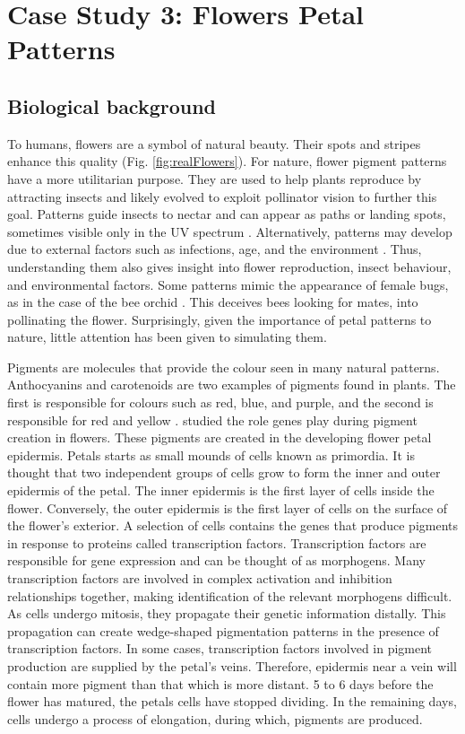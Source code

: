 \chapter{Case Study 3: Flowers Petal Patterns}

\section{Biological background}
To humans, flowers are a symbol of natural beauty. Their spots and stripes enhance this quality (Fig. \ref{fig:realFlowers}). For nature, flower pigment patterns have a more utilitarian purpose. They are used to help plants reproduce by attracting insects and likely evolved to exploit pollinator vision to further this goal. Patterns guide insects to nectar and can appear as paths or landing spots, sometimes visible only in the UV spectrum \citep{davies2012}. Alternatively, patterns may develop due to external factors such as infections, age, and the environment \citep{davies2012, robinson2015}. Thus, understanding them also gives insight into flower reproduction, insect behaviour, and environmental factors. Some patterns mimic the appearance of female bugs, as in the case of the bee orchid \citep{vereecken7484}. This deceives bees looking for mates, into pollinating the flower. Surprisingly, given the importance of petal patterns to nature, little attention has been given to simulating them.

Pigments are molecules that provide the colour seen in many natural patterns. Anthocyanins and carotenoids are two examples of pigments found in plants. The first is responsible for colours such as red, blue, and purple, and the second is responsible for red and yellow \citep{bayer1966}. \citet{martin1993} studied the role genes play during pigment creation in flowers. These pigments are created in the developing flower petal epidermis. Petals starts as small mounds of cells known as primordia. It is thought that two independent groups of cells grow to form the inner and outer epidermis of the petal. The inner epidermis is the first layer of cells inside the flower. Conversely, the outer epidermis is the first layer of cells on the surface of the flower's exterior. A selection of cells contains the genes that produce pigments in response to proteins called transcription factors. Transcription factors are responsible for gene expression and can be thought of as morphogens. Many transcription factors are involved in complex activation and inhibition relationships together, making identification of the relevant morphogens difficult. As cells undergo mitosis, they propagate their genetic information distally. This propagation can create wedge-shaped pigmentation patterns in the presence of transcription factors. In some cases, transcription factors involved in pigment production are supplied by the petal's veins. Therefore, epidermis near a vein will contain more pigment than that which is more distant. 5 to 6 days before the flower has matured, the petals cells have stopped dividing. In the remaining days, cells undergo a process of elongation, during which, pigments are produced.

